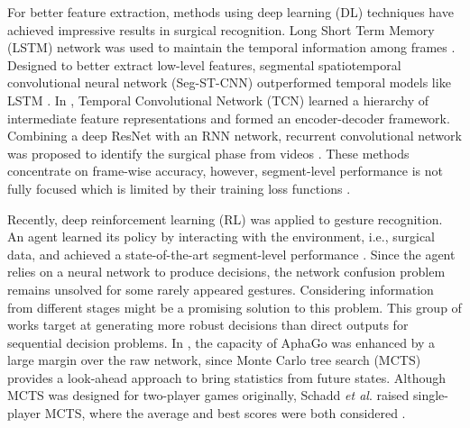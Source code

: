 \documentclass[letterpaper, 10 pt, conference]{ieeeconf}
\begin{document}
For better feature extraction, methods using deep learning (DL) techniques have achieved impressive results in surgical recognition. Long Short Term Memory (LSTM) network was used to maintain the temporal information among frames \cite{dipietro2016recognizing}. Designed to better extract low-level features, segmental spatiotemporal convolutional neural network (Seg-ST-CNN) outperformed temporal models like LSTM \cite{lea2016segmental}. In \cite{lea2016temporal,lea2017temporal}, Temporal Convolutional Network (TCN) learned a hierarchy of intermediate feature representations and formed an encoder-decoder framework. Combining a deep ResNet \cite{he2016deep} with an RNN network, recurrent convolutional network was proposed to identify the surgical phase from videos \cite{jin2017sv,zisimopoulos2018deepphase}. These methods concentrate on frame-wise accuracy, however, segment-level performance is not fully focused which is limited by their training loss functions \cite{liu2018deep}. 

Recently, deep reinforcement learning (RL) was applied to gesture recognition. An agent learned its policy by interacting with the environment, i.e., surgical data, and achieved a state-of-the-art segment-level performance \cite{liu2018deep}. Since the agent relies on a neural network to produce decisions, the network confusion \cite{jin2017sv,Itzkovich2019using} problem remains unsolved for some rarely appeared gestures. Considering information from different stages might be a promising solution to this problem. This group of works target at generating more robust decisions than direct outputs for sequential decision problems. In \cite{silver2016mastering,silver2017mastering}, the capacity of AphaGo was enhanced by a large margin over the raw network, since Monte Carlo tree search (MCTS) \cite{coulom2006efficient} provides a look-ahead approach to bring statistics from future states. Although MCTS was designed for two-player games originally, Schadd \textit{et al}. raised single-player MCTS, where the average and best scores were both considered \cite{schadd2008single}.
\end{document}
